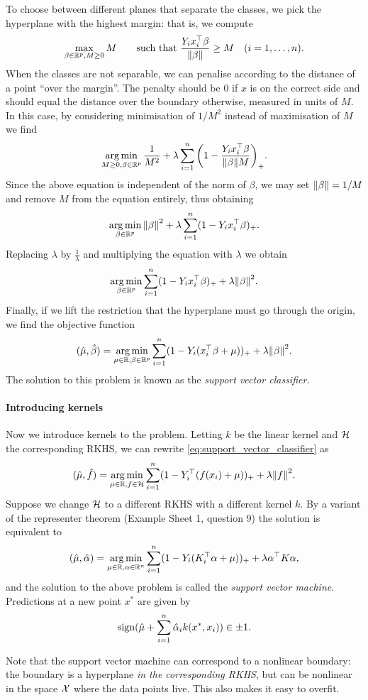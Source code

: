 To choose between different planes that separate the classes, we pick the hyperplane with the highest margin: that is, we compute
\[
\max_{\beta \in \mathbb R^p, M \geq 0} M \qquad\text{such that } \frac{Y_i x_i^\top\beta}{\norm{\beta}} \geq M \quad (i = 1,\dotsc, n). 
\]
When the classes are not separable, we can penalise according to the distance of a point ``over the margin''. The penalty should be 0 if $x$ is on the correct side and should equal the distance over the boundary otherwise, measured in units of $M$. In this case, by considering minimisation of $1/M^2$ instead of maximisation of $M$ we find
\[
\operatorname*{arg\,min}_{M \geq 0, \beta \in \mathbb R^p} \frac1{M^2} + \lambda \sum_{i=1}^n \qty(1 - \frac{Y_i x_i^\top \beta}{\norm{\beta} M})_+. 
\]
Since the above equation is independent of the norm of $\beta$, we may set $\norm{\beta} = 1/M$ and remove $M$ from the equation entirely, thus obtaining
\[
\operatorname*{arg\,min}_{\beta \in \mathbb R^p} \norm{\beta}^2 + \lambda \sum_{i=1}^n (1 - Y_i x_i^\top \beta)_+.
\]
Replacing $\lambda$ by $\frac1\lambda$ and multiplying the equation with $\lambda$ we obtain
\[
\operatorname*{arg\,min}_{\beta \in \mathbb R^p} \sum_{i=1}^n (1 - Y_i x_i^\top \beta)_+ + \lambda \norm{\beta}^2. 
\]
Finally, if we lift the restriction that the hyperplane must go through the origin, we find the objective function
\begin{equation} \label{eq:support_vector_classifier}
(\hat \mu, \hat\beta) = \operatorname*{arg\,min}_{\mu \in \mathbb R, \beta \in \mathbb R^p} \sum_{i=1}^n (1 - Y_i (x_i^\top\beta + \mu))_+ + \lambda  \norm{\beta}^2. 
\end{equation}
The solution to this problem is known as the \emph{support vector classifier}.  

\paragraph{Introducing kernels}
Now we introduce kernels to the problem. Letting $k$ be the linear kernel and $\mathcal H$ the corresponding RKHS, we can rewrite \cref{eq:support_vector_classifier} as
\[
(\hat \mu, \hat f) = \operatorname*{arg\,min}_{\mu \in \mathbb R, f \in \mathcal H} \sum_{i=1}^n (1 - Y_i^\top (f(x_i) + \mu))_+ + \lambda \norm{f}^2.
\]
Suppose we change $\mathcal H$ to a different RKHS with a different kernel $k$. By a variant of the representer theorem (Example Sheet 1, question 9) the solution is equivalent to
\[
(\hat\mu, \hat\alpha) = \operatorname*{arg\,min}_{\mu \in \mathbb R, \alpha \in \mathbb R^n} \sum_{i=1}^n (1 - Y_i (K_i^\top \alpha + \mu))_+ + \lambda \alpha^\top K\alpha, 
\]
and the solution to the above problem is called the \emph{support vector machine}.  Predictions at a new point $x^*$ are given by
\[
\operatorname{sign}(\hat\mu + \sum_{i=1}^n \hat\alpha_i k(x^*, x_i)) \in \pm 1. 
\]
\begin{remark}
Note that the support vector machine can correspond to a nonlinear boundary: the boundary is a hyperplane \emph{in the corresponding RKHS}, but can be nonlinear in the space $\mathcal X$ where the data points live. This also makes it easy to overfit. 
\end{remark}

